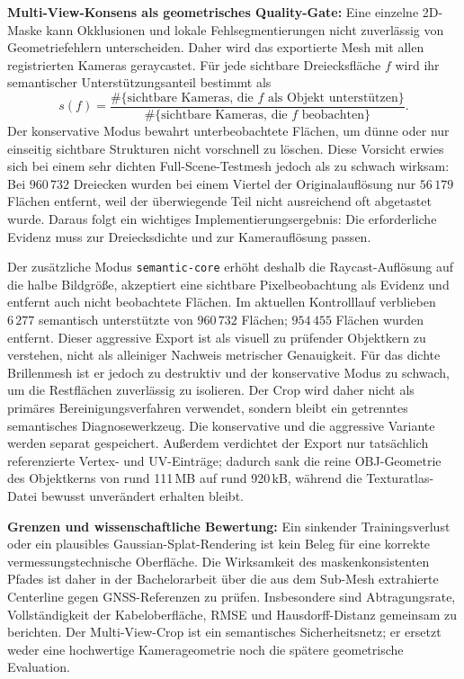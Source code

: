 \documentclass[12pt,a4paper]{article}
\begin{document}
\textbf{Multi-View-Konsens als geometrisches Quality-Gate:} Eine einzelne 2D-Maske kann Okklusionen und lokale Fehlsegmentierungen nicht zuverlässig von Geometriefehlern unterscheiden. Daher wird das exportierte Mesh mit allen registrierten Kameras geraycastet. Für jede sichtbare Dreiecksfläche $f$ wird ihr semantischer Unterstützungsanteil bestimmt als
\[
s(f) = \frac{\#\{\text{sichtbare Kameras, die } f \text{ als Objekt unterstützen}\}}
           {\#\{\text{sichtbare Kameras, die } f \text{ beobachten}\}}.
\]
Der konservative Modus bewahrt unterbeobachtete Flächen, um dünne oder nur einseitig sichtbare Strukturen nicht vorschnell zu löschen. Diese Vorsicht erwies sich bei einem sehr dichten Full-Scene-Testmesh jedoch als zu schwach wirksam: Bei $960\,732$ Dreiecken wurden bei einem Viertel der Originalauflösung nur $56\,179$ Flächen entfernt, weil der überwiegende Teil nicht ausreichend oft abgetastet wurde. Daraus folgt ein wichtiges Implementierungsergebnis: Die erforderliche Evidenz muss zur Dreiecksdichte und zur Kamerauflösung passen.

Der zusätzliche Modus \texttt{semantic-core} erhöht deshalb die Raycast-Auflösung auf die halbe Bildgröße, akzeptiert eine sichtbare Pixelbeobachtung als Evidenz und entfernt auch nicht beobachtete Flächen. Im aktuellen Kontrolllauf verblieben $6\,277$ semantisch unterstützte von $960\,732$ Flächen; $954\,455$ Flächen wurden entfernt. Dieser aggressive Export ist als visuell zu prüfender Objektkern zu verstehen, nicht als alleiniger Nachweis metrischer Genauigkeit. Für das dichte Brillenmesh ist er jedoch zu destruktiv und der konservative Modus zu schwach, um die Restflächen zuverlässig zu isolieren. Der Crop wird daher nicht als primäres Bereinigungsverfahren verwendet, sondern bleibt ein getrenntes semantisches Diagnosewerkzeug. Die konservative und die aggressive Variante werden separat gespeichert. Außerdem verdichtet der Export nur tatsächlich referenzierte Vertex- und UV-Einträge; dadurch sank die reine OBJ-Geometrie des Objektkerns von rund 111\,MB auf rund 920\,kB, während die Texturatlas-Datei bewusst unverändert erhalten bleibt.

\textbf{Grenzen und wissenschaftliche Bewertung:} Ein sinkender Trainingsverlust oder ein plausibles Gaussian-Splat-Rendering ist kein Beleg für eine korrekte vermessungstechnische Oberfläche. Die Wirksamkeit des maskenkonsistenten Pfades ist daher in der Bachelorarbeit über die aus dem Sub-Mesh extrahierte Centerline gegen GNSS-Referenzen zu prüfen. Insbesondere sind Abtragungsrate, Vollständigkeit der Kabeloberfläche, RMSE und Hausdorff-Distanz gemeinsam zu berichten. Der Multi-View-Crop ist ein semantisches Sicherheitsnetz; er ersetzt weder eine hochwertige Kamerageometrie noch die spätere geometrische Evaluation.
\end{document}
